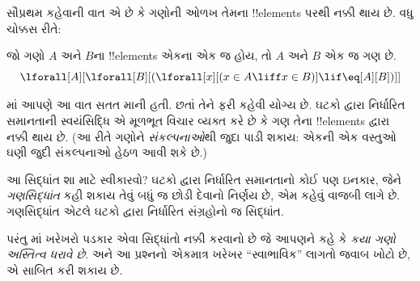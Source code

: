 \documentclass[../../../include/open-logic-section]{subfiles}
\begin{document}

સૌપ્રથમ કહેવાની વાત એ છે કે ગણોની ઓળખ તેમના !!{element}s પરથી
નક્કી થાય છે. વધુ ચોક્કસ રીતે:

\begin{axiom}[ઘટકો દ્વારા નિર્ધારિત સમાનતા]
જો ગણો $A$ અને $B$ના !!{element}s એકના એક જ હોય, તો $A$ અને $B$
એક જ ગણ છે.
\[
  \lforall[A][\lforall[B][(\lforall[x][(x \in A \liff x \in B)] \lif
  \eq[A][B])]]
\]
\end{axiom}

માં આપણે આ વાત સતત માની હતી. છતાં તેને ફરી
કહેવી યોગ્ય છે. ઘટકો દ્વારા નિર્ધારિત સમાનતાની સ્વયંસિદ્ધિ એ
મૂળભૂત વિચાર વ્યક્ત કરે છે કે ગણ તેના !!{element}s દ્વારા નક્કી
થાય છે. (આ રીતે ગણોને \emph{સંકલ્પનાઓ}થી જુદા પાડી શકાય: એકની એક
વસ્તુઓ ઘણી જુદી સંકલ્પનાઓ હેઠળ આવી શકે છે.)

આ સિદ્ધાંત શા માટે સ્વીકારવો? ઘટકો દ્વારા નિર્ધારિત સમાનતાનો કોઈ પણ
ઇનકાર, જેને \emph{ગણસિદ્ધાંત} કહી શકાય તેવું બધું જ છોડી દેવાનો
નિર્ણય છે, એમ કહેવું વાજબી લાગે છે. ગણસિદ્ધાંત એટલે ઘટકો દ્વારા
નિર્ધારિત સંગ્રહોનો જ સિદ્ધાંત.

પરંતુ માં ખરેખરો પડકાર એવા સિદ્ધાંતો નક્કી
કરવાનો છે જે આપણને કહે કે \emph{કયા ગણો અસ્તિત્વ ધરાવે છે}. અને
આ પ્રશ્નનો એકમાત્ર ખરેખર ``સ્વાભાવિક'' લાગતો જવાબ ખોટો છે, એ
સાબિત કરી શકાય છે.
\end{document}
